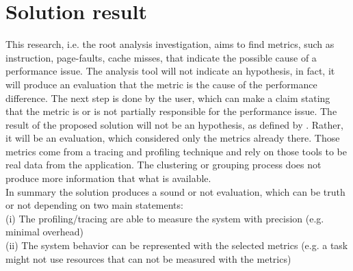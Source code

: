 \section{Solution result}  %
This research, i.e. the root analysis investigation, aims to find metrics, such as instruction, page-faults, cache misses, that indicate the possible cause of a performance issue. The analysis tool will not indicate an hypothesis, in fact, it will produce an evaluation that the metric is the cause of the performance difference. The next step is done by the user, which can make a claim stating that the metric is or is not partially responsible for the performance issue. 
The result of the proposed solution will not be an hypothesis, as defined by \cite{Blackburn2016TWT29822142983574}. Rather, it will be an evaluation, which considered only the metrics already there. Those metrics come from a tracing and profiling technique and rely on those tools to be real data from the application. The clustering or grouping process does not produce more information that what is available.\\
In summary the solution produces a sound or not evaluation, which can be truth or not depending on two main statements:\\
(i) The profiling/tracing are able to measure the system with precision (e.g. minimal overhead)\\
(ii) The system behavior can be represented with the selected metrics (e.g. a task might not use resources that can not be measured with the metrics)

